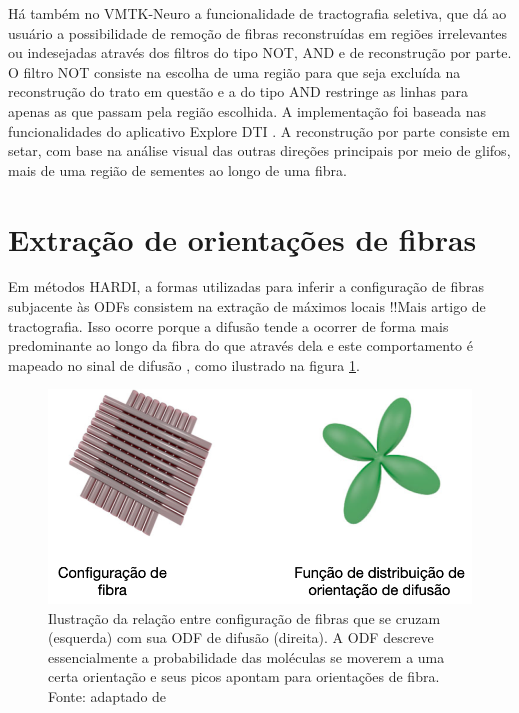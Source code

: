 \documentclass[
    12pt,                %
    oneside,            %
    a4paper,            %
    english,            %
    french,                %
    spanish,            %
    brazil                %
    ]{abntex2}
\begin{document}
Há também no VMTK-Neuro a funcionalidade de tractografia seletiva, que dá ao usuário a possibilidade de remoção de fibras reconstruídas em regiões irrelevantes ou indesejadas através dos filtros do tipo NOT, AND e de reconstrução por parte. O filtro NOT consiste na escolha de uma região para que seja excluída na reconstrução do trato em questão e a do tipo AND restringe as linhas para apenas as que passam pela região escolhida. A implementação foi  baseada nas funcionalidades do aplicativo Explore DTI \cite{exploredti2009}. A reconstrução por parte consiste em setar, com base na análise visual das outras direções principais por meio de glifos, mais de uma região de sementes ao longo de uma fibra.


\section{Extração de orientações de fibras}

Em métodos HARDI, a formas utilizadas para inferir a configuração de fibras subjacente às ODFs consistem na extração de máximos locais \cite{descoteaux2007}!!Mais artigo de tractografia. Isso ocorre porque a difusão tende a ocorrer de forma mais predominante ao longo da fibra do que através dela e este comportamento é mapeado no sinal de difusão \cite{DTI_Handbook}, como ilustrado na figura \ref{fig::fibravsodf}.


\begin{figure}[h]
    \centering
    \includegraphics[width=.45\linewidth, angle=0]{figs/Tractografia/FibraVSodf.png}
     \caption{Ilustração da relação entre configuração de fibras que se cruzam (esquerda) com sua ODF de difusão (direita). A ODF descreve essencialmente a probabilidade das moléculas se moverem a uma certa orientação e seus picos apontam para orientações de fibra. \\
     Fonte: adaptado de \cite{DTI_Handbook}
     }
     \label{fig::fibravsodf}
\end{figure}
\end{document}
